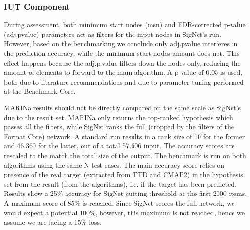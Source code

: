 \subsubsection{IUT Component}
During assessment, both minimum start nodes (msn) and FDR-corrected p-value (adj.pvalue) parameters act as filters for the input nodes in SigNet’s run. However, based on the benchmarking we conclude only adj.pvalue interferes in the prediction accuracy, while the minimum start nodes amount does not. This effect happens because the adj.p.value filters down the nodes only, reducing the amount of elements to forward to the main algorithm. A p-value of 0.05 is used, both due to literature recommendations and due to parameter tuning performed at the Benchmark Core.
\\

\begin{table}[]
\centering
{}
\end{table}

MARINa results should not be directly compared on the same scale as SigNet’s due to the result set. MARINa only returns the top-ranked hypothesis which passes all the filters, while SigNet ranks the full (cropped by the filters of the Format Core) network. A standard run results in a rank size of 10 for the former and 46.360 for the latter, out of a total 57.606 input. The accuracy scores are rescaled to the match the total size of the output.
The benchmark is run on both algorithms using the same N test cases. The main accuracy score relies on presence of the real target (extracted from TTD and CMAP2) in the hypothesis set from the result (from the algorithms), i.e. if the target has been predicted. 
Results show a 25\% accuracy for SigNet cutting threshold at the first 2000 items. A maximum score of 85\% is reached. Since SigNet scores the full network, we would expect a potential 100\%, however, this maximum is not reached, hence we assume we are facing a 15\% loss.
\\

